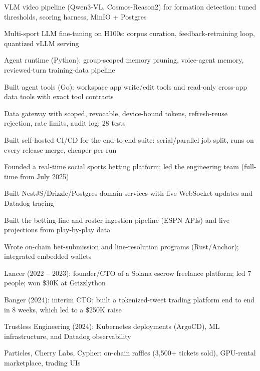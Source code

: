 \documentclass[print]{jack-resume}
\begin{document}
\begin{tightemize}
    \item VLM video pipeline (Qwen3-VL, Cosmos-Reason2) for formation detection: tuned thresholds, scoring harness, MinIO + Postgres
    \item Multi-sport LLM fine-tuning on H100s: corpus curation, feedback-retraining loop, quantized vLLM serving
    \item Agent runtime (Python): group-scoped memory pruning, voice-agent memory, reviewed-turn training-data pipeline
    \item Built agent tools (Go): workspace app write/edit tools and read-only cross-app data tools with exact tool contracts
    \item Data gateway with scoped, revocable, device-bound tokens, refresh-reuse rejection, rate limits, audit log; 28 tests
    \item Built self-hosted CI/CD for the end-to-end suite: serial/parallel job split, runs on every release merge, cheaper per run
\end{tightemize}
\sectionsep

\begin{tightemize}
    \item Founded a real-time social sports betting platform; led the engineering team (full-time from July 2025)
    \item Built NestJS/Drizzle/Postgres domain services with live WebSocket updates and Datadog tracing
    \item Built the betting-line and roster ingestion pipeline (ESPN APIs) and live projections from play-by-play data
    \item Wrote on-chain bet-submission and line-resolution programs (Rust/Anchor); integrated embedded wallets
\end{tightemize}
\sectionsep

\begin{tightemize}
    \item Lancer (2022 – 2023): founder/CTO of a Solana escrow freelance platform; led 7 people; won \$30K at Grizzlython
    \item Banger (2024): interim CTO; built a tokenized-tweet trading platform end to end in 8 weeks, which led to a \$250K raise
    \item Trustless Engineering (2024): Kubernetes deployments (ArgoCD), ML infrastructure, and Datadog observability
    \item Particles, Cherry Labs, Cypher: on-chain raffles (3,500+ tickets sold), GPU-rental marketplace, trading UIs
\end{tightemize}
\sectionsep
\end{document}
